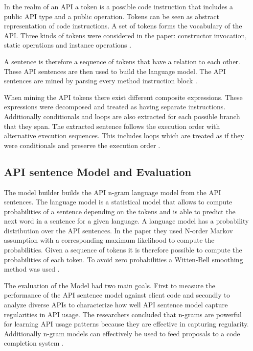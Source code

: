 In the realm of an API a token is a possible code instruction that includes a public API type and a public operation. Tokens can be seen as abstract representation of code instructions. A set of tokens forms the vocabulary of the API. Three kinds of tokens were considered in the paper: constructor invocation, static operations and instance operations \cite{Santos2017stepwise}. 

A sentence is therefore a sequence of tokens that have a relation to each other. These API sentences are then used to build the language model. The API sentences are mined by parsing every method instruction block \cite{Santos2017stepwise}. 

When mining the API tokens there exist different composite expressions. These expressions were decomposed and treated as having separate instructions. Additionally conditionals and loops are also extracted for each possible branch that they span. The extracted sentence follows the execution order with alternative execution sequences. This includes loops which are treated as if they were conditionals and preserve the execution order \cite{Santos2017stepwise}. 

\subsection{API sentence Model and Evaluation}
The model builder builds the API n-gram language model from the API sentences. The language model is a statistical model that allows to compute probabilities of a sentence depending on the tokens and is able to predict the next word in a sentence for a given language. A language model has a probability distribution over the API sentences. In the paper they used N-order Markov assumption  with a corresponding maximum likelihood to compute the probabilities. Given a sequence of tokens it is therefore possible to compute the probabilities of each token. To avoid zero probabilities a Witten-Bell smoothing method was used \cite{Santos2017stepwise}. 

The evaluation of the Model had two main goals. First to measure the performance of the API sentence model against client code and secondly to analyze diverse APIs to characterize how well API sentence model capture regularities in API usage. The researchers concluded that n-grams are powerful for learning API usage patterns because they are effective in capturing regularity. Additionally n-gram models can effectively be used to feed proposals to a code completion system \cite{Santos2017stepwise}. 




